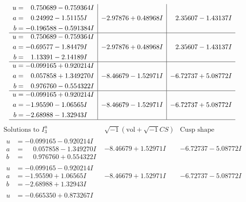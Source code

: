\documentclass[1p]{elsarticle_modified}
\theoremstyle{definition}
\newcommand{\I}{\sqrt{-1}}
\begin{document}
$$\begin{array}{c|c|c}
\begin{aligned}
u &= \phantom{-}0.750689 - 0.759364 I \\
a &= \phantom{-}0.24992 - 1.51155 I \\
b &= -0.196588 - 0.591384 I\end{aligned}
 & -2.97876 + 0.48968 I & \phantom{-}2.35607 - 1.43137 I \\ \hline\begin{aligned}
u &= \phantom{-}0.750689 - 0.759364 I \\
a &= -0.69577 - 1.84479 I \\
b &= \phantom{-}1.13391 - 2.14189 I\end{aligned}
 & -2.97876 + 0.48968 I & \phantom{-}2.35607 - 1.43137 I \\ \hline\begin{aligned}
u &= -0.099165 + 0.920214 I \\
a &= \phantom{-}0.057858 + 1.349270 I \\
b &= \phantom{-}0.976760 - 0.554322 I\end{aligned}
 & -8.46679 - 1.52971 I & -6.72737 + 5.08772 I \\ \hline\begin{aligned}
u &= -0.099165 + 0.920214 I \\
a &= -1.95590 - 1.06565 I \\
b &= -2.68988 - 1.32943 I\end{aligned}
 & -8.46679 - 1.52971 I & -6.72737 + 5.08772 I\\
 \hline 
 \end{array}$$\newpage$$\begin{array}{c|c|c}  
\text{Solutions to }I^u_{3}& \I (\text{vol} + \sqrt{-1}CS) & \text{Cusp shape}\\
 \hline 
\begin{aligned}
u &= -0.099165 - 0.920214 I \\
a &= \phantom{-}0.057858 - 1.349270 I \\
b &= \phantom{-}0.976760 + 0.554322 I\end{aligned}
 & -8.46679 + 1.52971 I & -6.72737 - 5.08772 I \\ \hline\begin{aligned}
u &= -0.099165 - 0.920214 I \\
a &= -1.95590 + 1.06565 I \\
b &= -2.68988 + 1.32943 I\end{aligned}
 & -8.46679 + 1.52971 I & -6.72737 - 5.08772 I \\ \hline\begin{aligned}
u &= -0.665350 + 0.873267 I \\

\end{aligned}
\end{array}$$
\end{document}
